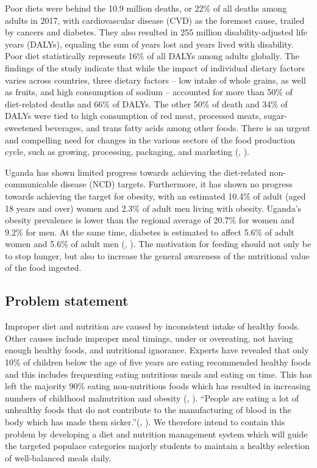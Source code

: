 \documentclass{article}
\begin{document}
Poor diets were behind the 10.9 million deaths, or 22\% of all deaths among adults in 2017, with cardiovascular disease (CVD) as the foremost cause, trailed by cancers and diabetes. They also resulted in 255 million disability-adjusted life years (DALYs), equaling the sum of years lost and years lived with disability. Poor diet statistically represents 16\% of all DALYs among adults globally. The findings of the study indicate that while the impact of individual dietary factors varies across countries, three dietary factors – low intake of whole grains, as well as fruits, and high consumption of sodium – accounted for more than 50\% of diet-related deaths and 66\% of DALYs. The other 50\% of death and 34\% of DALYs were tied to high consumption of red meat, processed meats, sugar-sweetened beverages, and trans fatty acids among other foods. There is an urgent and compelling need for changes in the various sectors of the food production cycle, such as growing, processing, packaging, and marketing (\citeauthor{ihme2019new}, \citeyear{ihme2019new}).

Uganda has shown limited progress towards achieving the diet-related non-communicable disease (NCD) targets. Furthermore, it has shown no progress towards achieving the target for obesity, with an estimated 10.4\% of adult (aged 18 years and over) women and 2.3\% of adult men living with obesity. Uganda's obesity prevalence is lower than the regional average of 20.7\% for women and 9.2\% for men. At the same time, diabetes is estimated to affect 5.6\% of adult women and 5.6\% of adult men (\citeauthor{globalnutritionreportn.d.}, \citeyear{globalnutritionreportn.d.}). The motivation for feeding should not only be to stop hunger, but also to increase the general awareness of the nutritional value of the food ingested.

\subsection{Problem statement}
Improper diet and nutrition are caused by inconsistent intake of healthy foods. Other causes include improper meal timings, under or overeating, not having enough healthy foods, and nutritional ignorance. Experts have revealed that only 10\% of children below the age of five years are eating recommended healthy foods and this includes frequenting eating nutritious meals and eating on time. This has left the majority 90\% eating non-nutritious foods which has resulted in increasing numbers of childhood malnutrition and obesity (\citeauthor{tumwine2022only}, \citeyear{tumwine2022only}). “People are eating a lot of unhealthy foods that do not contribute to the manufacturing of blood in the body which has made them sicker.”(\citeauthor{tumwine2022only}, \citeyear{tumwine2022only}). We therefore intend to contain this problem by developing a diet and nutrition management system which will guide the targeted populace categories majorly students to maintain a healthy selection of well-balanced meals daily.
\end{document}
